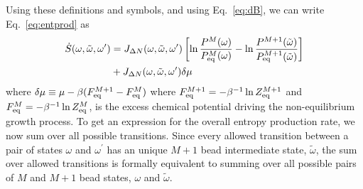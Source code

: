\documentclass[amsmath,preprintnumbers,10pt,nofootinbib,prl,twocolumn]{revtex4-1}
\begin{document}
Using these definitions and symbols, and using Eq.~\ref{eq:dB}, we can write Eq.~\ref{eq:entprod} as 
\begin{equation}
\label{eq:entprod2}
    \begin{split}
      \dot{S}(\omega,\tilde\omega,\omega^\prime)&=J_{\Delta N}(\omega,\tilde\omega,\omega^\prime)\left[\ln\frac{P^M(\omega)}{P_{\rm eq}^M(\omega)}-\ln\frac{P^{M+1}(\tilde\omega)}{P_{\rm eq}^{M+1}(\tilde\omega)}\right]\\&+J_{\Delta N}(\omega,\tilde\omega,\omega^\prime)\delta \mu
    \end{split}
\end{equation}
where $\delta \mu\equiv \mu-\beta (F^{M+1}_{\rm eq}-F^M_{\rm eq})$ where $F^{M+1}_{\rm eq}=-\beta^{-1}\ln Z^{M+1}_{\rm eq}$ and $F^{M}_{\rm eq}=-\beta^{-1}\ln Z^{M}_{\rm eq}$, is the excess chemical potential driving the non-equilibrium growth process. 
To get an expression for the overall entropy production rate, we now sum over all possible transitions. Since every allowed transition between a pair of states $\omega$ and $\omega^\prime$ has an unique $M+1$ bead intermediate state, $\tilde \omega$, the sum over allowed transitions is formally equivalent to summing over all possible pairs of $M$ and $M+1$ bead states, $\omega$ and $\tilde\omega$. 
\end{document}
